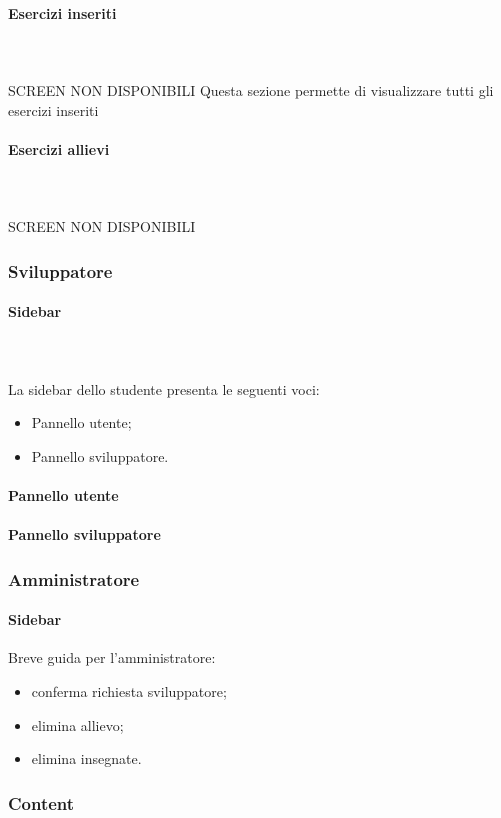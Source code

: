         \paragraph{Esercizi inseriti}\mbox{}\\ \\
        SCREEN NON DISPONIBILI
        Questa sezione permette di visualizzare tutti gli esercizi inseriti
        \paragraph{Esercizi allievi}\mbox{}\\ \\
        SCREEN NON DISPONIBILI

    \subsubsection{Sviluppatore}
    
    \paragraph{Sidebar}\mbox{}\\ \\
    La sidebar dello studente presenta le seguenti voci:
    \begin{itemize}
    \item Pannello utente;
    \item Pannello sviluppatore.
    \end{itemize}
    \paragraph{Pannello utente}
    \paragraph{Pannello sviluppatore}
    
\subsubsection{Amministratore}
\paragraph{Sidebar}
Breve guida per l'amministratore:
\begin{itemize}
\item conferma richiesta sviluppatore;
\item elimina allievo;
\item elimina insegnate.
\end{itemize}
\subsubsection{Content}
